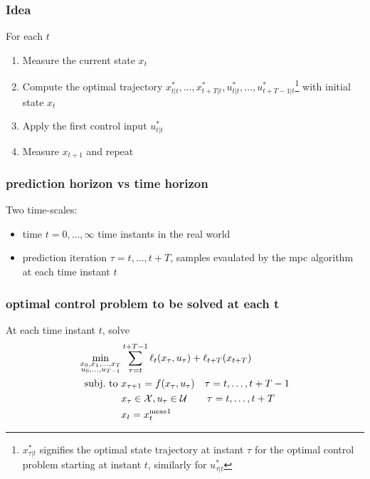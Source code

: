 \documentclass[openany]{book}
\theoremstyle{definition}
\theoremstyle{remark}
\begin{document}
\subsubsection{Idea} %
For each $t$
\begin{enumerate}
    \item Measure the current state $x_t$ 
    \item Compute the optimal trajectory $x^*_{t|t},\dots,x^*_{t+T|t},u^*_{t|t},\dots,u^*_{t+T-1|t}$\footnote{$x^*_{\tau|t}$ signifies the optimal state trajectory at instant $\tau$ for the optimal control problem starting at instant $t$, similarly for $u^*_{\tau|t}$} with initial state $x_t$
    \item Apply the first control input $u^*_{t|t}$
    \item Measure $x_{t+1}$ and repeat
\end{enumerate}
\subsubsection{prediction horizon vs time horizon}
Two time-scales: 
\begin{itemize}
    \item time $t=0,\dots,\infty$ time instants in the real world 
    \item prediction iteration $\tau=t,\dots,t+T$, samples evaulated by the mpc algorithm at each time instant $t$
\end{itemize}
\subsubsection{optimal control problem to be solved at each t}
At each time instant $t$, solve 
\begin{align*}
    \min_{\substack{x_0,x_1,\dots,x_T\\u_0,\dots,u_{T-1}}} & \displaystyle\sum_{\tau=t}^{t+T-1}\ell_t(x_\tau,u_\tau)+\ell_{t+T}(x_{t+T})\\
        \text{subj.\ to } & x_{\tau+1}=f(x_\tau,u_\tau) \quad \tau=t,\dots,t+T-1\\
                         & x_\tau \in \mathcal{X}, u_\tau \in \mathcal{U} \qquad \tau=t,\dots,t+T\\
                         & x_t = x_t^{\text{meas}}\text{\footnotemark}
\end{align*}
\end{document}
